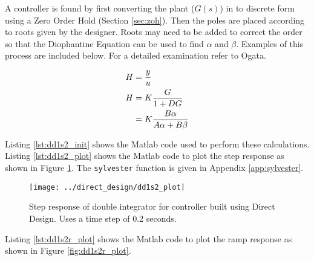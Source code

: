 \documentclass{article}
\newcommand{\sincludepdf}[2][]{
	
}
\begin{document}
A controller is found by first converting the plant ($G(s)$) in to discrete
form using a Zero Order Hold (Section \ref{sec:zoh}).
Then the poles are placed according to roots given by the designer.
Roots may need to be added to correct the order so that the Diophantine
Equation can be used to find $\alpha$ and $\beta$.
Examples of this process are included below.
For a detailed examination refer to Ogata\autocite[Pg. 517]{ogata1995discrete}.

\begin{align}
	H &= \frac{y}{u} \notag \\
	H &= K \frac{G}{1 + D G} \\
	  &= K \frac{B \alpha}{A \alpha + B \beta}
\end{align}

\sincludepdf[pages=1,
			pagecommand=\subsection*{Example 1}
	]{scan/11211302.pdf}
\sincludepdf[pages=2-5]{scan/11211302.pdf}

Listing \ref{lst:dd1s2_init} shows the Matlab code used to perform
these calculations.
Listing \ref{lst:dd1s2_plot} shows the Matlab code to plot the step response
as shown in Figure \ref{fig:dd1s2_plot}.
The \verb+sylvester+ function is given in Appendix \ref{app:sylvester}.



\clearpage


\begin{figure}
\begin{center}
\texttt{[image: ../direct\_design/dd1s2\_plot]}
\end{center}
\caption{Step response of double integrator for controller built
using Direct Design. Uses a time step of 0.2 seconds.}
\label{fig:dd1s2_plot}
\end{figure}

\clearpage
Listing \ref{lst:dd1s2r_plot} shows the Matlab code to plot the ramp response
as shown in Figure \ref{fig:dd1s2r_plot}.


\end{document}
